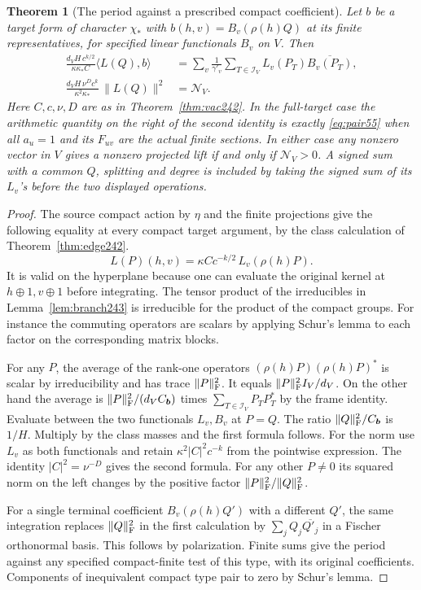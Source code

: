 \documentclass[a4paper,11pt]{article}
\newtheorem{theorem}[proposition]{Theorem}
\theoremstyle{definition}
\theoremstyle{remark}
\numberwithin{equation}{section}
\begin{document}
\begin{theorem}[The period against a prescribed compact coefficient]
\label{thm:fixed243}
Let \(b\) be a target form of character \(\chi_*\) with
\(b(h,v)=B_v(\rho(h)Q)\) at its finite representatives, for
specified linear functionals \(B_v\) on \(V\). Then
\begin{align*}
 \frac{d_V H\,c^{k/2}}{\kappa\kappa_* C}
       \langle L(Q),b\rangle
   &=\sum_v\frac{1}{\gamma'_v}\sum_{T\in\mathcal I_V}
                       L_v(P_T)\overline{B_v(P_T)},\\
 \frac{d_V H\,\nu^D c^k}{\kappa^2\kappa_*}\,
                   \|L(Q)\|^2&=\mathcal N_V .
\end{align*}
Here \(C,c,\nu,D\) are as in Theorem~\ref{thm:vac242}.
In the full-target case the arithmetic quantity on the right of
the second identity is exactly \eqref{eq:pair55} when all
\(a_u=1\) and its \(F_{uv}\) are the actual finite sections.
In either case any nonzero vector in \(V\) gives a nonzero
projected lift if and only if \(\mathcal N_V>0\).
A signed sum with a common \(Q\), splitting and degree is
included by taking the signed sum of its \(L_v\)'s before the
two displayed operations.
\end{theorem}
\begin{proof}
The source compact action by \(\eta\) and the finite projections
give the following equality at every compact target argument,
by the class calculation of Theorem~\ref{thm:edge242}.
\[
       L(P)(h,v)=\kappa Cc^{-k/2}\,L_v(\rho(h)P).
\]
It is valid on the hyperplane because one can evaluate the original
kernel at \(h\oplus1,v\oplus1\) before integrating. The tensor
product of the irreducibles in Lemma~\ref{lem:branch243} is
irreducible for the product of the compact groups. For instance
the commuting operators are scalars by applying Schur's lemma
to each factor on the corresponding matrix blocks.

For any \(P\), the average of the rank-one operators
\((\rho(h)P)(\rho(h)P)^*\) is scalar by irreducibility and
has trace \(\|P\|^2_{\rm F}\). It equals
\(\|P\|^2_{\rm F} I_V/d_V\). On the other hand the average is
\(\|P\|^2_{\rm F}/(d_V C_{\boldsymbol b})\) times
\(\sum_{T\in\mathcal I_V}P_T P_T^*\) by the frame identity.
Evaluate between the two functionals \(L_v,B_v\) at \(P=Q\).
The ratio \(\|Q\|^2_{\rm F}/C_{\boldsymbol b}\) is \(1/H\).
Multiply by the class masses and the first formula follows.
For the norm use \(L_v\) as both functionals and retain
\(\kappa^2|C|^2c^{-k}\) from the pointwise expression. The
identity \(|C|^2=\nu^{-D}\) gives the second formula. For any
other \(P\ne0\) its squared norm on the left changes by the
positive factor \(\|P\|^2_{\rm F}/\|Q\|^2_{\rm F}\).

For a single terminal coefficient \(B_v(\rho(h)Q')\) with a
different \(Q'\), the same integration replaces
\(\|Q\|_{\rm F}^2\) in the first calculation by
\(\sum_j Q_j\overline{Q'_j}\) in a Fischer orthonormal basis.
This follows by polarization. Finite sums give the period against
any specified compact-finite test of this type, with its original
coefficients. Components of inequivalent compact type pair to zero
by Schur's lemma.
\end{proof}
\end{document}
